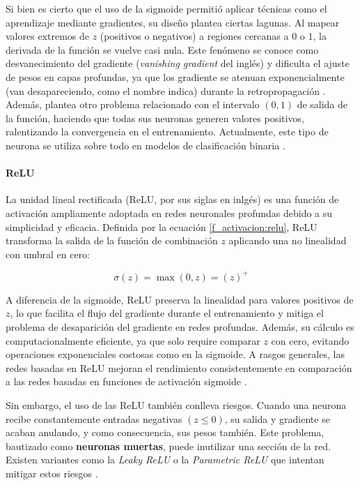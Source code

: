 Si bien es cierto que el uso de la sigmoide permitió aplicar técnicas como el aprendizaje mediante gradientes, su diseño plantea ciertas lagunas. Al mapear valores extremos de $z$ (positivos o negativos) a regiones cercanas a $0$ o $1$, la derivada de la función se vuelve casi nula. Este fenómeno se conoce como desvanecimiento del gradiente (\textit{vanishing gradient} del inglés) y dificulta el ajuste de pesos en capas profundas, ya que los gradiente se atenuan exponencialmente (van desapareciendo, como el nombre indica) durante la retropropagación \cite{dl_fundamentos__casas_roma_2020}. Además, plantea otro problema relacionado con el intervalo $(0,1)$ de salida de la función, haciendo que todas sus neuronas generen valores positivos, ralentizando la convergencia en el entrenamiento. Actualmente, este tipo de neurona se utiliza sobre todo en modelos de clasificación binaria \cite{dl_python__chollet_2021}.

\paragraph{ReLU} \label{sec:relu}

La unidad lineal rectificada (ReLU, por sus siglas en inlgés) es una función de activación ampliamente adoptada en redes neuronales profundas debido a su simplicidad y eficacia. Definida por la ecuación \ref{f_activacion:relu}, ReLU transforma la salida de la función de combinación $z$ aplicando una no linealidad con umbral en cero:

\begin{equation}\label{f_activacion:relu}
    \sigma(z) = \max(0, z) = (z)^+
\end{equation}

A diferencia de la sigmoide, ReLU preserva la linealidad para valores positivos de $z$, lo que facilita el flujo del gradiente durante el entrenamiento y mitiga el problema de desaparición del gradiente en redes profundas. Además, su cálculo es computacionalmente eficiente, ya que solo require comparar $z$ con cero, evitando operaciones exponenciales costosas como en la sigmoide. A rasgos generales, las redes basadas en ReLU mejoran el rendimiento consistentemente en comparación a las redes basadas en funciones de activación sigmoide \cite{dl_python__chollet_2021}.

Sin embargo, el uso de las ReLU también conlleva riesgos. Cuando una neurona recibe constantemente entradas negativas $(z \leq 0)$, su salida y gradiente se acaban anulando, y como consecuencia, sus pesos también. Este problema, bautizado como \textbf{neuronas muertas}, puede inutilizar una sección de la red. Existen variantes como la \textit{Leaky ReLU} o la \textit{Parametric ReLU} que intentan mitigar estos riesgos \cite{dl__goodfellow_2016}.

